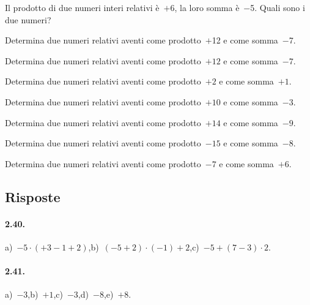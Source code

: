 \begin{multicols}{2}
\begin{esercizio}
 Il prodotto di due numeri interi relativi è~$+6$, la loro somma è~$-$5. Quali sono i due numeri?
\end{esercizio}


\begin{esercizio}
 Determina due numeri relativi aventi come prodotto~$+$12 e come somma~$-$7.
\end{esercizio}

\begin{esercizio}
 Determina due numeri relativi aventi come
prodotto~$+12$ e come somma~$-7$.
\end{esercizio}

\begin{esercizio}
 Determina due numeri relativi aventi come
prodotto~$+2$ e come somma~$+1$.
\end{esercizio}

\begin{esercizio}
 Determina due numeri relativi aventi come
prodotto~$+10$ e come somma~$-3$.
\end{esercizio}

\begin{esercizio}
 Determina due numeri relativi aventi come
prodotto~$+14$ e come somma~$-9$.
\end{esercizio}

\begin{esercizio}
 Determina due numeri relativi aventi come
prodotto~$-15$ e come somma~$-8$.
\end{esercizio}

\begin{esercizio}
 Determina due numeri relativi aventi come
prodotto~$-7$ e come somma~$+6$.
\end{esercizio}
\end{multicols}
\subsection{Risposte}

\paragraph{2.40.}
a)~$-5\cdot(+3-1+2)$,\quad b)~$(-5+2)\cdot(-1)+2$,\quad c)~$-5+(7-3)\cdot2$.

\paragraph{2.41.}
a)~$-3$,\quad b)~$+1$,\quad c)~$-3$,\quad d)~$-8$,\quad e)~$+8$.

